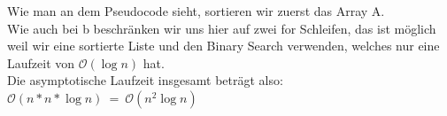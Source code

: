 \documentclass[12pt,a4paper,headsepline]{scrreprt}
\begin{document}
Wie man an dem Pseudocode sieht, sortieren wir zuerst das Array A.\\
Wie auch bei b beschränken wir uns hier auf zwei for Schleifen, das ist möglich weil wir eine sortierte Liste und den Binary Search verwenden, welches nur eine Laufzeit von $\mathcal{O}(\log n)$ hat.\\
Die asymptotische Laufzeit insgesamt beträgt also:~~~ $\mathcal{O}(n*n*\log n) ~=~ \mathcal{O}(n^2 \log n)$




 
\end{document}
